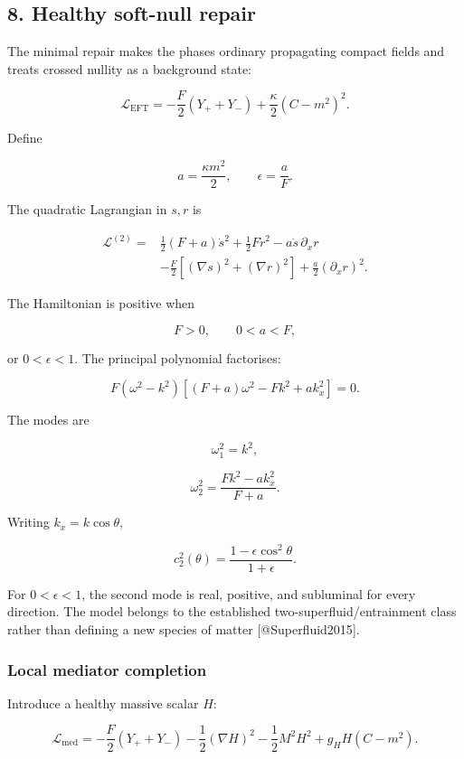 \documentclass[
]{article}
\begin{document}
\hypertarget{healthy-soft-null-repair}{%
\subsection{8. Healthy soft-null
repair}\label{healthy-soft-null-repair}}

The minimal repair makes the phases ordinary propagating compact fields
and treats crossed nullity as a background state:

\[
\boxed{
\mathcal L_{\mathrm{EFT}}
=-\frac F2(Y_++Y_-)
+\frac\kappa2(C-m^2)^2.
}
\]

Define

\[
a=\frac{\kappa m^2}{2},
\qquad
\epsilon=\frac aF.
\]

The quadratic Lagrangian in \(s,r\) is

\[
\begin{aligned}
\mathcal L^{(2)}={}&
\frac12(F+a)\dot s^2
+\frac12F\dot r^2
-a\dot s\,\partial_xr\\
&-\frac F2[(\nabla s)^2+(\nabla r)^2]
+\frac a2(\partial_xr)^2.
\end{aligned}
\]

The Hamiltonian is positive when

\[
\boxed{F>0,\qquad0<a<F,}
\]

or \(0<\epsilon<1\). The principal polynomial factorises:

\[
F(\omega^2-k^2)
\left[(F+a)\omega^2-Fk^2+ak_x^2\right]=0.
\]

The modes are

\[
\omega_1^2=k^2,
\]

\[
\omega_2^2=\frac{Fk^2-ak_x^2}{F+a}.
\]

Writing \(k_x=k\cos\theta\),

\[
\boxed{
c_2^2(\theta)=\frac{1-\epsilon\cos^2\theta}{1+\epsilon}.
}
\]

For \(0<\epsilon<1\), the second mode is real, positive, and subluminal
for every direction. The model belongs to the established
two-superfluid/entrainment class rather than defining a new species of
matter {[}@Superfluid2015{]}.

\hypertarget{local-mediator-completion}{%
\subsubsection{Local mediator
completion}\label{local-mediator-completion}}

Introduce a healthy massive scalar \(H\):

\[
\mathcal L_{\mathrm{med}}
=-\frac F2(Y_++Y_-)
-\frac12(\nabla H)^2
-\frac12M^2H^2
+g_HH(C-m^2).
\]
\end{document}
